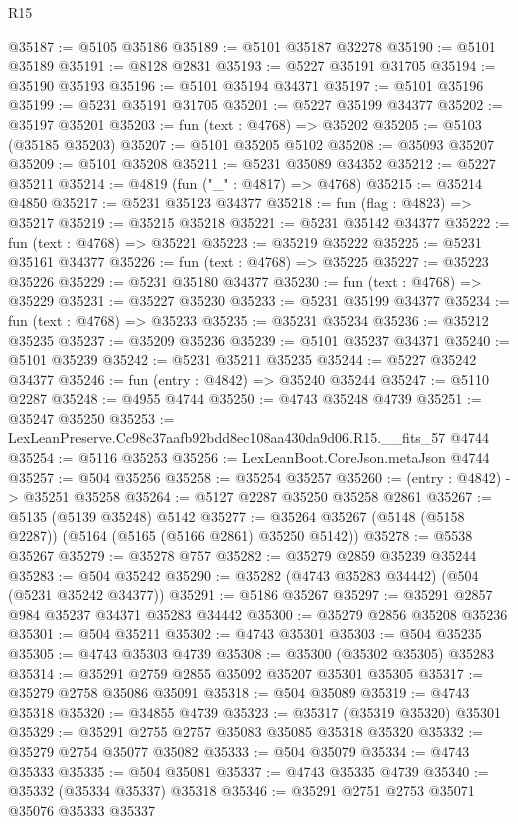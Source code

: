 \begin{lexlean}{R15}
\begin{coremodule}
{{{{{{{{{{{@35187 := @5105 @35186
@35189 := @5101 @35187 @32278
@35190 := @5101 @35189
@35191 := @8128 @2831
@35193 := @5227 @35191 @31705
@35194 := @35190 @35193
@35196 := @5101 @35194 @34371
@35197 := @5101 @35196
@35199 := @5231 @35191 @31705
@35201 := @5227 @35199 @34377
@35202 := @35197 @35201
@35203 := fun (text : @4768) => @35202
@35205 := @5103 (@35185 @35203)
@35207 := @5101 @35205 @5102
@35208 := @35093 @35207
@35209 := @5101 @35208
@35211 := @5231 @35089 @34352
@35212 := @5227 @35211
@35214 := @4819 (fun ("_" : @4817) => @4768)
@35215 := @35214 @4850
@35217 := @5231 @35123 @34377
@35218 := fun (flag : @4823) => @35217
@35219 := @35215 @35218
@35221 := @5231 @35142 @34377
@35222 := fun (text : @4768) => @35221
@35223 := @35219 @35222
@35225 := @5231 @35161 @34377
@35226 := fun (text : @4768) => @35225
@35227 := @35223 @35226
@35229 := @5231 @35180 @34377
@35230 := fun (text : @4768) => @35229
@35231 := @35227 @35230
@35233 := @5231 @35199 @34377
@35234 := fun (text : @4768) => @35233
@35235 := @35231 @35234
@35236 := @35212 @35235
@35237 := @35209 @35236
@35239 := @5101 @35237 @34371
@35240 := @5101 @35239
@35242 := @5231 @35211 @35235
@35244 := @5227 @35242 @34377
@35246 := fun (entry : @4842) => @35240 @35244
@35247 := @5110 @2287
@35248 := @4955 @4744
@35250 := @4743 @35248 @4739
@35251 := @35247 @35250
@35253 := LexLeanPreserve.Cc98c37aafb92bdd8ec108aa430da9d06.R15.__fits_57 @4744
@35254 := @5116 @35253
@35256 := LexLeanBoot.CoreJson.metaJson @4744
@35257 := @504 @35256
@35258 := @35254 @35257
@35260 := (entry : @4842) -> @35251 @35258
@35264 := @5127 @2287 @35250 @35258 @2861
@35267 := @5135 (@5139 @35248) @5142
@35277 := @35264 @35267 (@5148 (@5158 @2287)) (@5164 (@5165 (@5166 @2861) @35250 @5142))
@35278 := @5538 @35267
@35279 := @35278 @757
@35282 := @35279 @2859 @35239 @35244
@35283 := @504 @35242
@35290 := @35282 (@4743 @35283 @34442) (@504 (@5231 @35242 @34377))
@35291 := @5186 @35267
@35297 := @35291 @2857 @984 @35237 @34371 @35283 @34442
@35300 := @35279 @2856 @35208 @35236
@35301 := @504 @35211
@35302 := @4743 @35301
@35303 := @504 @35235
@35305 := @4743 @35303 @4739
@35308 := @35300 (@35302 @35305) @35283
@35314 := @35291 @2759 @2855 @35092 @35207 @35301 @35305
@35317 := @35279 @2758 @35086 @35091
@35318 := @504 @35089
@35319 := @4743 @35318
@35320 := @34855 @4739
@35323 := @35317 (@35319 @35320) @35301
@35329 := @35291 @2755 @2757 @35083 @35085 @35318 @35320
@35332 := @35279 @2754 @35077 @35082
@35333 := @504 @35079
@35334 := @4743 @35333
@35335 := @504 @35081
@35337 := @4743 @35335 @4739
@35340 := @35332 (@35334 @35337) @35318
@35346 := @35291 @2751 @2753 @35071 @35076 @35333 @35337
}}}}}}}}}}}
\end{coremodule}
\end{lexlean}
